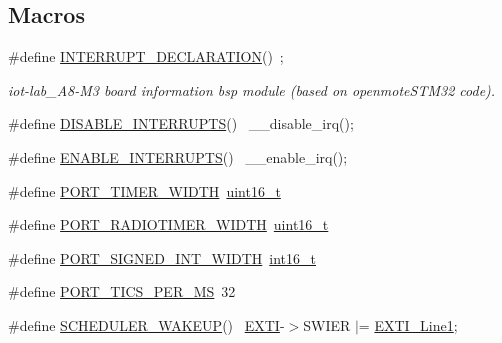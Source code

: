 \subsection*{Macros}
\begin{DoxyCompactItemize}
\item 
\#define \hyperlink{iot-lab___a8-_m3_2board__info_8h_aafcaa3cb5de374b74117d66a78e6589b}{I\+N\+T\+E\+R\+R\+U\+P\+T\+\_\+\+D\+E\+C\+L\+A\+R\+A\+T\+I\+ON}()~;
\begin{DoxyCompactList}\small\item\em iot-\/lab\+\_\+\+A8-\/\+M3 board information bsp module (based on openmote\+S\+T\+M32 code). \end{DoxyCompactList}\item 
\#define \hyperlink{iot-lab___a8-_m3_2board__info_8h_a8eb672ccdf01b424c5e6d085013fd47f}{D\+I\+S\+A\+B\+L\+E\+\_\+\+I\+N\+T\+E\+R\+R\+U\+P\+TS}()    ~\+\_\+\+\_\+disable\+\_\+irq();
\item 
\#define \hyperlink{iot-lab___a8-_m3_2board__info_8h_a067b9176075d532963a05e0422d2de56}{E\+N\+A\+B\+L\+E\+\_\+\+I\+N\+T\+E\+R\+R\+U\+P\+TS}()      ~\+\_\+\+\_\+enable\+\_\+irq();
\item 
\#define \hyperlink{iot-lab___a8-_m3_2board__info_8h_abe66b9c1c60db84f2a99f2b827275f24}{P\+O\+R\+T\+\_\+\+T\+I\+M\+E\+R\+\_\+\+W\+I\+D\+TH}~\hyperlink{_p_e___types_8h_a1f1825b69244eb3ad2c7165ddc99c956}{uint16\+\_\+t}
\item 
\#define \hyperlink{iot-lab___a8-_m3_2board__info_8h_ac16e02aadd749b2d27638bed1a805a59}{P\+O\+R\+T\+\_\+\+R\+A\+D\+I\+O\+T\+I\+M\+E\+R\+\_\+\+W\+I\+D\+TH}~\hyperlink{_p_e___types_8h_a1f1825b69244eb3ad2c7165ddc99c956}{uint16\+\_\+t}
\item 
\#define \hyperlink{iot-lab___a8-_m3_2board__info_8h_a07a9f9de95908017f808cbf0c474828e}{P\+O\+R\+T\+\_\+\+S\+I\+G\+N\+E\+D\+\_\+\+I\+N\+T\+\_\+\+W\+I\+D\+TH}~\hyperlink{_p_e___types_8h_a932e6ccc3d54c58f761c1aead83bd6d7}{int16\+\_\+t}
\item 
\#define \hyperlink{iot-lab___a8-_m3_2board__info_8h_a71ac4f01b5932487c50c4f1a4b821a92}{P\+O\+R\+T\+\_\+\+T\+I\+C\+S\+\_\+\+P\+E\+R\+\_\+\+MS}~32
\item 
\#define \hyperlink{iot-lab___a8-_m3_2board__info_8h_a279c683842015c43581411bfa8362081}{S\+C\+H\+E\+D\+U\+L\+E\+R\+\_\+\+W\+A\+K\+E\+UP}()                                ~\hyperlink{group___peripheral__declaration_ga9189e770cd9b63dadd36683eb9843cac}{E\+X\+TI}-\/$>$S\+W\+I\+ER $\vert$= \hyperlink{openmotestm_2library_2inc_2stm32f10x__exti_8h_ae7c6ab2a0880ce3810641ee0585104cd}{E\+X\+T\+I\+\_\+\+Line1};

\end{DoxyCompactItemize}
